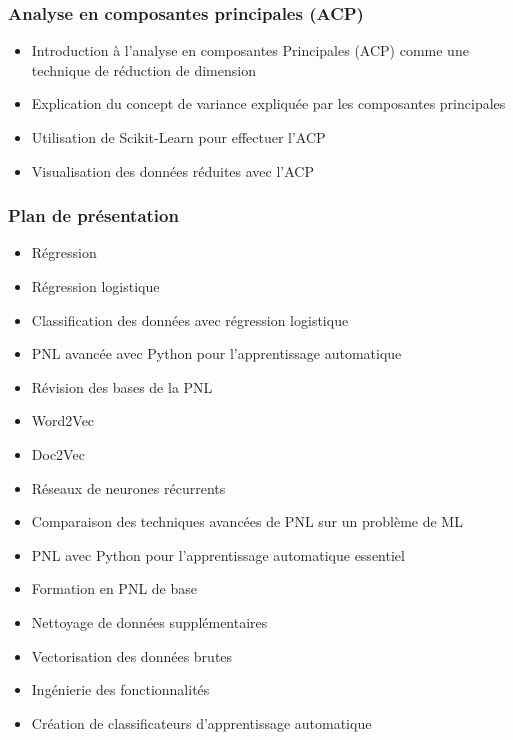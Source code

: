 \documentclass{beamer}
\begin{document}
\begin{frame}
	\frametitle{Analyse en composantes principales (ACP)}
	\begin{itemize}
		\item Introduction à l'analyse en composantes Principales (ACP) comme une technique de réduction de dimension
		\item Explication du concept de variance expliquée par les composantes principales
		\item Utilisation de Scikit-Learn pour effectuer l'ACP
		\item Visualisation des données réduites avec l'ACP
	\end{itemize}
\end{frame}


\begin{frame}
	\frametitle{Plan de présentation}
	\begin{itemize}
		\item Régression
		\item Régression logistique
		\item Classification des données avec régression logistique
		\item PNL avancée avec Python pour l'apprentissage automatique
		\item Révision des bases de la PNL
		\item Word2Vec
		\item Doc2Vec
		\item Réseaux de neurones récurrents
		\item Comparaison des techniques avancées de PNL sur un problème de ML
		\item PNL avec Python pour l'apprentissage automatique essentiel
		\item Formation en PNL de base
		\item Nettoyage de données supplémentaires
		\item Vectorisation des données brutes
		\item Ingénierie des fonctionnalités
		\item Création de classificateurs d'apprentissage automatique
	\end{itemize}
\end{frame}
\end{document}
